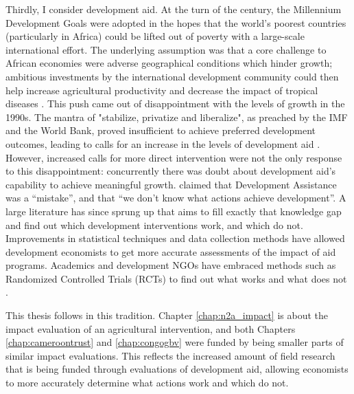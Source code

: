 Thirdly, I consider development aid. At the turn of the century, the Millennium Development Goals were adopted in the hopes that the world's poorest countries (particularly in Africa) could be lifted out of poverty with a large-scale international effort. The underlying assumption was that a core challenge to African economies were adverse geographical conditions which hinder growth; ambitious investments by the international development community could then help increase agricultural productivity and decrease the impact of tropical diseases \citep{Sachs2005}. This push came out of disappointment with the levels of growth in the 1990s. The mantra of "stabilize, privatize and liberalize", as preached by the IMF and the World Bank, proved insufficient to achieve preferred development outcomes, leading to calls  for an increase in the levels of development aid \citep{Rodrik2006a}. However, increased calls for more direct intervention were not the only response to this disappointment: concurrently there was doubt about development aid's capability to achieve meaningful growth. \citet[p.~329]{Easterly2007} claimed that Development Assistance was a ``mistake'', and that ``we don't know what actions achieve development''. A large literature has since sprung up that aims to fill exactly that knowledge gap and find out which development interventions work, and which do not. Improvements in statistical techniques and data collection methods have allowed development economists to get more accurate assessments of the impact of aid programs. Academics and development NGOs have embraced methods such as Randomized Controlled Trials (RCTs) to find out what works and what does not \citep[see e.g.][]{Bannerjee2011}.  

This thesis follows in this tradition. Chapter \ref{chap:n2a_impact} is about the impact evaluation of an agricultural intervention, and both Chapters \ref{chap:cameroontrust} and \ref{chap:congogbv} were funded by being smaller parts of similar impact evaluations. This reflects the increased amount of field research that is being funded through evaluations of development aid, allowing economists to more accurately determine what actions work and which do not. 


